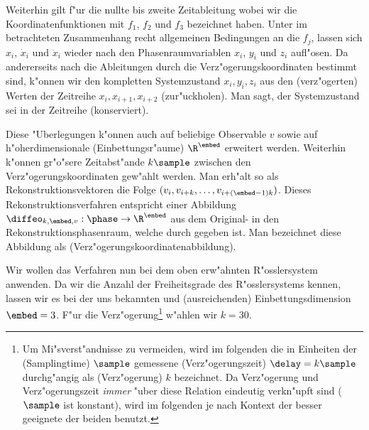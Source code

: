 Weiterhin gilt f"ur die nullte bis zweite Zeitableitung
wobei wir die Koordinatenfunktionen mit $f_1$, $f_2$ und $f_3$ bezeichnet haben. Unter im
betrachteten Zusammenhang recht allgemeinen Bedingungen an die $f_j$,
lassen sich $x_i$, $\dot x_i$ und $\ddot x_i$ wieder nach den Phasenraumvariablen $x_i$,
$y_i$ und $z_i$ aufl"osen.  Da andererseits nach  die Ableitungen durch die
Verz"ogerungskoordinaten bestimmt sind, k"onnen wir den kompletten Systemzustand
$x_i,y_i,z_i$ aus den \begriff(verz"ogerten) Werten der Zeitreihe $x_{i},x_{i+1},x_{i+2}$
\metapher(zur"uckholen). Man sagt, der Systemzustand sei in der Zeitreihe
\metapher(konserviert).


Diese "Uberlegungen k"onnen auch auf beliebige Observable $v$ sowie auf h"oherdimensionale
\begriff(Einbettungsr"aume) $\R^\embed$ erweitert werden. Weiterhin k"onnen gr"o"sere
Zeitabst"ande $k\sample$ zwischen den Verz"ogerungskoordinaten gew"ahlt werden.  Man
erh"alt so als Rekonstruktionsvektoren die Folge $(v_{i},
v_{i+k},\dots,v_{i+(\embed-1)k})$. Dieses Rekonstruktionsverfahren entspricht einer
Abbildung $\diffeo_{k,\embed,v}:\phase\to\R^\embed$ aus dem Original- in den
Rekonstruktionsphasenraum, welche durch
gegeben ist. Man bezeichnet diese Abbildung  als \begriff(Verz"ogerungskoordinatenabbildung).

Wir wollen das Verfahren nun bei dem oben erw"ahnten R"osslersystem anwenden.
Da wir die Anzahl der Freiheitsgrade des R"osslersystems kennen, lassen wir es bei der uns
bekannten und \naja(ausreichenden) Einbettungsdimension $\embed=3$. F"ur die Verz"ogerung\footnote{Um Mi"sverst"andnisse
zu vermeiden, wird im folgenden die in Einheiten der \begriff(Samplingtime) $\sample$ gemessene 
\begriff(Verz"ogerungszeit) $\delay=k\sample$ durchg"angig als \begriff(Verz"ogerung) $k$
bezeichnet. Da Verz"ogerung und Verz"ogerungszeit {\em immer}  "uber diese Relation
eindeutig verkn"upft sind ($\sample$ ist konstant), wird im folgenden je nach Kontext der
besser geeignete der beiden benutzt.} w"ahlen wir $k=30$. 

